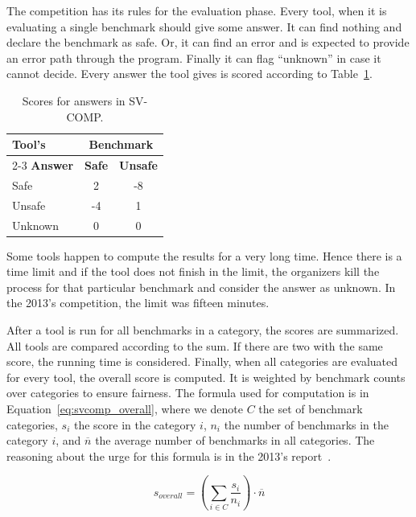 The competition has its rules for the evaluation phase. Every tool, when
it is evaluating a single benchmark should give some answer. It can find
nothing and declare the benchmark as safe. Or, it can find an error and is
expected to provide an error path through the program. Finally it can flag
``unknown'' in case it cannot decide. Every answer the tool gives is scored
according to Table~\ref{tab:svcomp_scores}.
\begin{table}[htb]
  \begin{center}
  \begin{tabular}{|l|c|c|} \hline
  \textbf{Tool's}  & \multicolumn{2}{c|}{\textbf{Benchmark}} \\ \cline{2-3}
  \textbf{Answer}  & \textbf{Safe} & \textbf{Unsafe} \\ \hline
  \textsf{Safe}    &  2 & -8 \\
  \textsf{Unsafe}  & -4 &  1 \\
  \textsf{Unknown} &  0 &  0 \\ \hline
  \end{tabular}
  \end{center}
  \caption{Scores for answers in SV-COMP.}
  \label{tab:svcomp_scores}
\end{table}
Some tools happen to compute the results for a very long time. Hence there is
a time limit and if the tool does not finish in the limit, the organizers kill
the process for that particular benchmark and consider the answer as unknown.
In the 2013's competition, the limit was fifteen minutes.

After a tool is run for all benchmarks in a category, the scores are
summarized. All tools are compared according to the sum. If there are two with
the same score, the running time is considered. Finally, when all categories
are evaluated for every tool, the overall score is computed. It is weighted by
benchmark counts over categories to ensure fairness. The formula used for
computation is in Equation~\ref{eq:svcomp_overall}, where we denote $C$ the
set of benchmark categories, $s_i$ the score in the category $i$, $n_i$ the
number of benchmarks in the category $i$, and $\overline{n}$ the average
number of benchmarks in all categories. The reasoning about the urge for this
formula is in the 2013's report~\cite{sv-comp13}.

\begin{equation}\label{eq:svcomp_overall}
s_{overall} = \left( \sum_{i \in C} \frac{s_i}{n_i}\right) \cdot \overline{n}
\end{equation}

